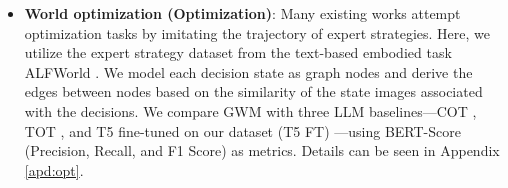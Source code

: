 \begin{itemize}[leftmargin=1em, itemsep=0pt]
\item \textbf{World optimization (Optimization)}:  Many existing works \citep{ho2016generative,hussein2017imitation,yang2024embodied} attempt optimization tasks by imitating the trajectory of expert strategies. Here, we utilize the expert strategy dataset from the text-based embodied task ALFWorld \citep{shridhar2020alfworld,yang2024embodied}. %
We model each decision state as graph nodes and derive the edges between nodes based on the similarity of the state images associated with the decisions.  We compare GWM with three LLM baselines—COT \citep{wei2022chain}, TOT \citep{yao2024tree}, and T5 \citep{raffel2020exploring} fine-tuned on our dataset (T5 FT) —using BERT-Score \citep{zhang2019bertscore} (Precision, Recall, and F1 Score) as metrics. Details can be seen in Appendix \ref{apd:opt}. 



\end{itemize}


\begin{table}[!tbp]
\setlength\tabcolsep{3pt}
\centering
\begin{footnotesize}
\vspace{-1mm}
\caption{\textbf{Recommendation on Baby, Sports, and Clothing}. Compared with three classical graph baselines, GWM achieved state-of-the-art results on most metrics.} %
\label{tab:Recommender systems}
\end{footnotesize}
\end{table}


